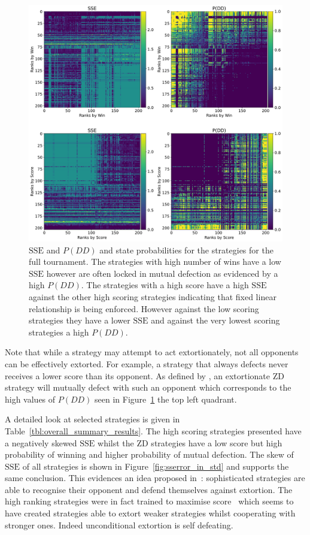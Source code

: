 \documentclass[a4paper]{article}
\newcommand{\SSe}{\text{SSE}}
\begin{document}
\begin{figure}[!htbp]
    \centering
    \includegraphics[width=.95\textwidth]{./assets/img/sse_chi_probabilities_in_full/main.pdf}
    \caption{\(\SSe\) and \(P(DD)\) and state probabilities for the strategies for
        the full tournament. The strategies with high number of wins
        have a low \(\SSe\) however are often locked in mutual defection as
        evidenced by a high \(P(DD)\). The strategies with a high score
        have a high \(\SSe\) against the other high scoring strategies
        indicating that fixed linear relationship is being enforced. However
        against the low scoring strategies they have a lower \(\SSe\) and
        against the very lowest scoring strategies a high \(P(DD)\).}
    \label{fig:sse_chi_probabilities_in_full}
\end{figure}

Note that while a strategy may attempt to act extortionately, not all opponents
can be effectively extorted. For example, a strategy that always defects never
receives a lower score than its opponent. As defined by \cite{Press2012}, an
extortionate ZD strategy will mutually defect with such an opponent which
corresponds to the high values of \(P(DD)\) seen in
Figure~\ref{fig:sse_chi_probabilities_in_full} the top left quadrant.

A detailed look at selected strategies is given in
Table~\ref{tbl:overall_summary_results}. The high scoring strategies presented
have a negatively skewed \(\SSe\) whilst the ZD strategies have a low score but
high probability of winning and higher probability of mutual defection.
The skew of \(\SSe\) of all strategies is shown in
Figure~\ref{fig:sserror_in_std} and supports the
same conclusion. This evidences an idea proposed
in~\cite{adami2013evolutionary}: sophisticated strategies are able to recognise
their opponent and defend themselves against extortion.  The high ranking
strategies were in fact trained to maximise score~\cite{Harper2017} which seems
to have created strategies able to extort weaker strategies whilst cooperating
with stronger ones. Indeed unconditional extortion is self defeating.
\end{document}
